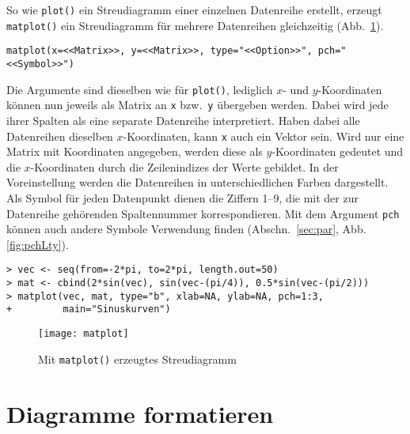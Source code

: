 So wie \lstinline!plot()! ein Streudiagramm einer einzelnen Datenreihe erstellt, erzeugt \lstinline!matplot()! ein Streudiagramm für mehrere Datenreihen gleichzeitig (Abb.\ \ref{fig:matplot}).
\begin{lstlisting}
matplot(x=<<Matrix>>, y=<<Matrix>>, type="<<Option>>", pch="<<Symbol>>")
\end{lstlisting}

Die Argumente sind dieselben wie für \lstinline!plot()!, lediglich $x$- und $y$-Koordinaten können nun jeweils als Matrix an \lstinline!x! bzw.\ \lstinline!y! übergeben werden. Dabei wird jede ihrer Spalten als eine separate Datenreihe interpretiert. Haben dabei alle Datenreihen dieselben $x$-Koordinaten, kann \lstinline!x! auch ein Vektor sein. Wird nur eine Matrix mit Koordinaten angegeben, werden diese als $y$-Koordinaten gedeutet und die $x$-Koordinaten durch die Zeilenindizes der Werte gebildet. In der Voreinstellung werden die Datenreihen in unterschiedlichen Farben dargestellt. Als Symbol für jeden Datenpunkt dienen die Ziffern 1--9, die mit der zur Datenreihe gehörenden Spaltennummer korrespondieren. Mit dem Argument \lstinline!pch! können auch andere Symbole Verwendung finden (Abschn.\ \ref{sec:par}, Abb. \ref{fig:pchLty}).
\begin{lstlisting}
> vec <- seq(from=-2*pi, to=2*pi, length.out=50)
> mat <- cbind(2*sin(vec), sin(vec-(pi/4)), 0.5*sin(vec-(pi/2)))
> matplot(vec, mat, type="b", xlab=NA, ylab=NA, pch=1:3,
+         main="Sinuskurven")
\end{lstlisting}

\begin{figure}[ht]
\centering
\texttt{[image: matplot]}
\vspace*{-1.5em}
\caption{Mit \lstinline!matplot()! erzeugtes Streudiagramm}
\label{fig:matplot}
\end{figure}

\section{Diagramme formatieren}
\label{sec:graphFormat}

